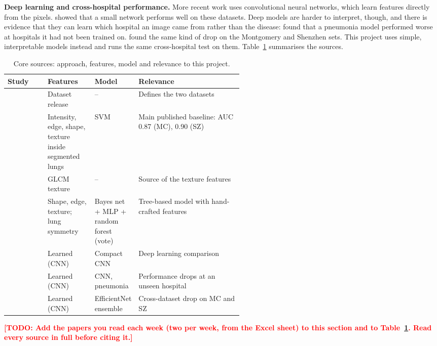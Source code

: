 \documentclass[11pt,a4paper]{article}
\newcommand{\todo}[1]{\textcolor{red}{\textbf{[TODO: #1]}}}
\begin{document}
\noindent\textbf{Deep learning and cross-hospital performance. }More recent work uses convolutional neural networks, which learn features directly from the pixels. \citet{pasa2019} showed that a small network performs well on these datasets. Deep models are harder to interpret, though, and there is evidence that they can learn which hospital an image came from rather than the disease: \citet{zech2018} found that a pneumonia model performed worse at hospitals it had not been trained on. \citet{hansun2024} found the same kind of drop on the Montgomery and Shenzhen sets. This project uses simple, interpretable models instead and runs the same cross-hospital test on them. Table~\ref{tab:lit} summarises the sources.

\begin{table}[htbp]
  \centering
  \caption{Core sources: approach, features, model and relevance to this project.}
  \label{tab:lit}
  \footnotesize
  \begin{tabularx}{\linewidth}{>{\raggedright\arraybackslash}p{0.17\linewidth} >{\raggedright\arraybackslash}p{0.2\linewidth} >{\raggedright\arraybackslash}p{0.17\linewidth} X}
    \toprule
    \textbf{Study} & \textbf{Features} & \textbf{Model} & \textbf{Relevance} \\
    \midrule
    \citet{jaeger2014} & Dataset release & -- & Defines the two datasets \\
    \citet{jaeger2014tmi} & Intensity, edge, shape, texture inside segmented lungs & SVM & Main published baseline: AUC 0.87 (MC), 0.90 (SZ) \\
    \citet{haralick1973} & GLCM texture & -- & Source of the texture features \\
    \citet{santosh2018} & Shape, edge, texture; lung symmetry & Bayes net + MLP + random forest (vote) & Tree-based model with hand-crafted features \\
    \citet{pasa2019} & Learned (CNN) & Compact CNN & Deep learning comparison \\
    \citet{zech2018} & Learned (CNN) & CNN, pneumonia & Performance drops at an unseen hospital \\
    \citet{hansun2024} & Learned (CNN) & EfficientNet ensemble & Cross-dataset drop on MC and SZ \\
    \bottomrule
  \end{tabularx}
\end{table}

\todo{Add the papers you read each week (two per week, from the Excel sheet) to this section and to Table~\ref{tab:lit}. Read every source in full before citing it.}
\end{document}
